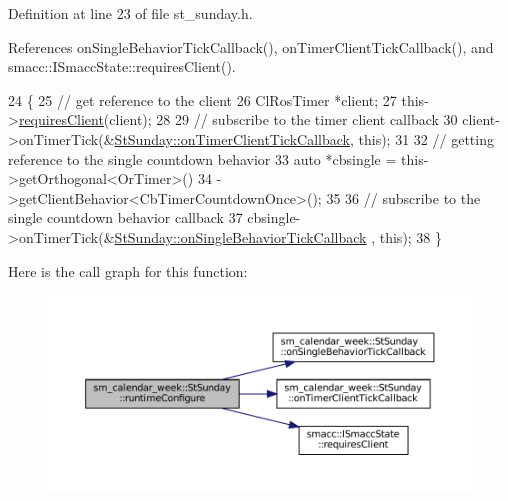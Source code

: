 Definition at line 23 of file st\+\_\+sunday.\+h.



References on\+Single\+Behavior\+Tick\+Callback(), on\+Timer\+Client\+Tick\+Callback(), and smacc\+::\+I\+Smacc\+State\+::requires\+Client().


\begin{DoxyCode}
24     \{
25         \textcolor{comment}{// get reference to the client}
26         ClRosTimer *client;
27         this->\hyperlink{classsmacc_1_1ISmaccState_a7f95c9f0a6ea2d6f18d1aec0519de4ac}{requiresClient}(client);
28 
29         \textcolor{comment}{// subscribe to the timer client callback}
30         client->onTimerTick(&\hyperlink{structsm__calendar__week_1_1StSunday_a6bba2c59172fea49fc346a658b592557}{StSunday::onTimerClientTickCallback}, \textcolor{keyword}{this});
31 
32         \textcolor{comment}{// getting reference to the single countdown behavior}
33         \textcolor{keyword}{auto} *cbsingle = this->getOrthogonal<OrTimer>()
34                              ->getClientBehavior<CbTimerCountdownOnce>();
35 
36         \textcolor{comment}{// subscribe to the single countdown behavior callback}
37         cbsingle->onTimerTick(&\hyperlink{structsm__calendar__week_1_1StSunday_a5fd7a600527ff7246a90fffede448544}{StSunday::onSingleBehaviorTickCallback}
      , \textcolor{keyword}{this});
38     \}
\end{DoxyCode}
Here is the call graph for this function\+:
\nopagebreak
\begin{figure}[H]
\begin{center}
\leavevmode
\includegraphics[width=350pt]{structsm__calendar__week_1_1StSunday_a28c840bf204044472162a7d3f14da28b_cgraph}
\end{center}
\end{figure}
\mbox{\label{structsm__calendar__week_1_1StSunday_ac9d8f202395f72b238783630e8c1d2f2}} 
